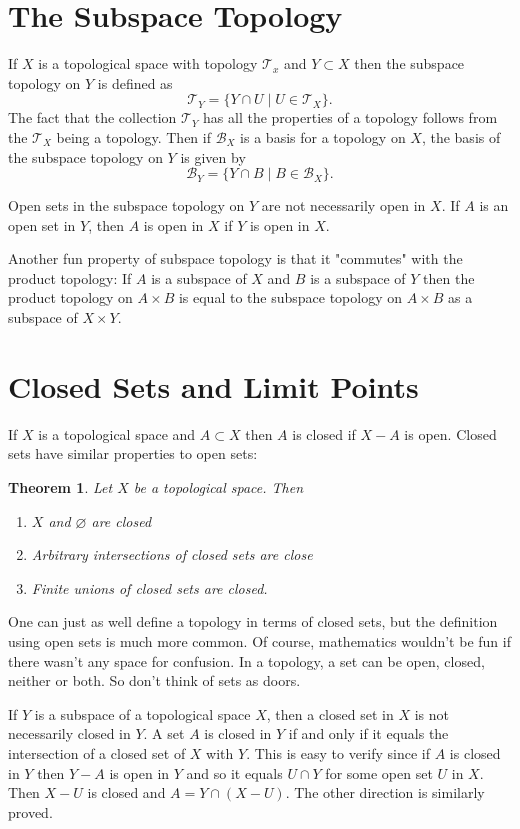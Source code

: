 \documentclass{article}
\newcommand{\Ba}{\mathcal{B}}
\newcommand{\Ta}{\mathcal{T}}
\newtheorem{theorem}{Theorem}[section]
\theoremstyle{remark}
\begin{document}
\section{The Subspace Topology}
If $X$ is a topological space with topology $\Ta_x$ and $Y\subset X$ then the subspace topology on $Y$ is defined as
$$
    \Ta_Y=\{Y\cap U\mid U\in\Ta_X\}.
$$
The fact that the collection $\Ta_Y$ has all the properties of a topology follows from the $\Ta_X$ being a topology.
Then if $\Ba_X$ is a basis for a topology on $X$, the basis of the subspace topology on $Y$ is given by
$$
    \Ba_Y=\{Y\cap B\mid B\in\Ba_X\}.
$$

Open sets in the subspace topology on $Y$ are not necessarily open in $X$.
If $A$ is an open set in $Y$, then $A$ is open in $X$ if $Y$ is open in $X$.

Another fun property of subspace topology is that it "commutes" with the product topology:
If $A$ is a subspace of $X$ and $B$ is a subspace of $Y$ then the product topology on $A\times B$ is equal to the subspace topology on $A\times B$ as a subspace of $X\times Y$.

\section{Closed Sets and Limit Points}
If $X$ is a topological space and $A\subset X$ then $A$ is closed if $X-A$ is open.
Closed sets have similar properties to open sets:
\begin{theorem}
    Let $X$ be a topological space. Then
    \begin{enumerate}
        \item $X$ and $\varnothing$ are closed
        \item Arbitrary intersections of closed sets are close
        \item Finite unions of closed sets are closed.
    \end{enumerate}
\end{theorem}
One can just as well define a topology in terms of closed sets, but the definition using open sets is much more common.
Of course, mathematics wouldn't be fun if there wasn't any space for confusion. In a topology, a set can be open, closed, neither or both. 
So don't think of sets as doors. 

If $Y$ is a subspace of a topological space $X$, then a closed set in $X$ is not necessarily closed in $Y$.
A set $A$ is closed in $Y$ if and only if it equals the intersection of a closed set of $X$ with $Y$. 
This is easy to verify since if $A$ is closed in $Y$ then $Y-A$ is open in $Y$ and so it equals $U\cap Y$ for some open set $U$ in $X$. 
Then $X-U$ is closed and $A=Y\cap(X-U)$. The other direction is similarly proved.
\end{document}

